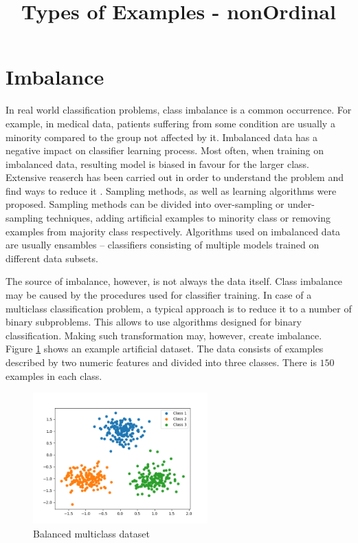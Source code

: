 \documentclass[12pt]{article}
\title{Types of Examples - nonOrdinal}
\begin{document}
\section{Imbalance}

In real world classification problems, class imbalance is a common occurrence. For example, in medical data, patients suffering from some condition are usually a minority compared to the group not affected by it. Imbalanced data has a negative impact on classifier learning process. Most often, when training on imbalanced data, resulting model is biased in favour for the larger class. Extensive reaserch has been carried out in order to understand the problem and find ways to reduce it \cite{Napierala2016, Blaszczynski2014}. Sampling methods, as well as learning algorithms were proposed. Sampling methods can be divided into over-sampling or under-sampling techniques, adding artificial examples to minority class or removing examples from majority class respectively. Algorithms used on imbalanced data are usually ensambles -- classifiers consisting of multiple models trained on different data subsets.

The source of imbalance, however, is not always the data itself. Class imbalance may be caused by the procedures used for classifier training. In case of a multiclass classification problem, a typical approach is to reduce it to a number of binary subproblems. This allows to use algorithms designed for binary classification. Making such transformation may, however, create imbalance. Figure \ref{img:balanced} shows an example artificial dataset. The data consists of examples described by two numeric features and divided into three classes. There is $150$ examples in each class.

\begin{figure}[H]
\centering
\includegraphics[width=0.6\textwidth]{balanced_data.png}
\caption{Balanced multiclass dataset}
\label{img:balanced}
\end{figure}
\end{document}
